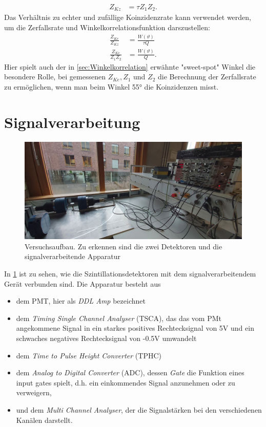 \documentclass[%
aps,
onecolumn,
11pt,
tightenlines,
nofootinbib,
superscriptaddress,
floatfix,
prd,
]{revtex4-2}
\begin{document}
\begin{align}
	Z_{Kz} &= \tau Z_1 Z_2.
\end{align}
Das Verhältnis zu echter und zufällige Koinzidenzrate kann verwendet werden, um die Zerfallsrate und Winkelkorrelationsfunktion darszustellen:
\begin{align}
	\frac{Z_{Ke}}{Z_{Kz}} &= \frac{W(\vartheta)}{\tau Q} \\
	\frac{Z_{Ke}}{Z_1Z_2} &= \frac{W(\vartheta)}{Q}. \label{eq:qvalue}
\end{align}
Hier spielt auch der in \ref{sec:Winkelkorrelation} erwähnte "sweet-spot" Winkel die besondere Rolle, bei gemessenen $Z_{Ke}, Z_1$ und $Z_2$ die Berechnung der Zerfallsrate zu ermöglichen, wenn man beim Winkel 55° die Koinzidenzen misst.

\section{Signalverarbeitung}
\label{sec:Signalverarbeitung}
\begin{figure}[ht]
	\includegraphics[scale=0.14]{images/setting.jpg}
	\caption{Versuchsaufbau. Zu erkennen sind die zwei Detektoren und die signalverarbeitende Apparatur}
	\label{fig:setting}
\end{figure}
In \ref{fig:setting} ist zu sehen, wie die Szintillationsdetektoren mit dem signalverarbeitendem Gerät verbunden sind. Die Apparatur besteht aus
\begin{itemize}
	\item dem PMT, hier als \textit{DDL Amp} bezeichnet
	\item dem \textit{Timing Single Channel Analyser} (TSCA), das das vom PMt angekommene Signal in ein starkes positives Rechtecksignal von 5V und ein schwaches negatives Rechtecksignal von -0.5V umwandelt
	\item dem \textit{Time to Pulse Height Converter} (TPHC)
	\item dem \textit{Analog to Digital Converter} (ADC), dessen \textit{Gate} die Funktion eines input gates spielt, d.h. ein einkommendes Signal anzunehmen oder zu verweigern,
	\item und dem \textit{Multi Channel Analyser}, der die Signalstärken bei den verschiedenen Kanälen darstellt.
\end{itemize}
\newpage
\end{document}
